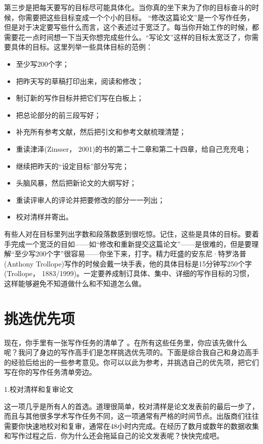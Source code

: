 第三步是把每天要写的目标尽可能具体化。当你真的坐下来为了你的目标奋斗的时候，你需要把这些目标变成一个个小的目标。 “修改这篇论文”是一个写作任务，但是对于决定要写些什么而言，这个表述过于宽泛了。每当你开始工作的时候，都需要花一点时间想一下当天你想完成些什么。“写论文”这样的目标太宽泛了，你需要具体的目标。这里列举一些具体目标的范例：
\begin{itemize}
  \item 至少写200个字；
  \item 把昨天写的草稿打印出来，阅读和修改；
  \item 制订新的写作目标并把它们写在白板上；
  \item 把总论部分的前三段写好；
  \item 补充所有参考文献，然后把引文和参考文献梳理清楚；
  \item 重读津泽(Zinsser， 2001)的书的第二十二章和第二十四章，给自己充充电；
  \item 继续把昨天的“设定目标”部分写完；
  \item 头脑风暴，然后把新论文的大纲写好；
  \item 重读评审人的评论并把要修改的部分一一列出；
  \item 校对清样并寄出。
\end{itemize}

有些人对在目标里列出字数和段落数感到很吃惊。记住，这些是具体的目标。要着手完成一个宽泛的目如——如“修改和重新提交这篇论文”——是很难的，但是要理解“至少写200个字”很容易——你坐下来，打字。精力旺盛的安东尼·特罗洛普(Anthony Trollope)写作的时候会戴一块手表，他的具体目标是15分钟写250个字(Trollope， 1883/1999)。一定要养成制订具体、集中、详细的写作目标的习惯，这样能够避免不知道做什么和不知道怎么做。


\section{挑选优先项}
现在，你手里有一张写作任务的清单了 。在所有这些任务里，你应该先做什么呢？我问了身边的写作高手们是怎样挑选优先项的。下面是综合我自己和身边高手的经验后给出的一些参考意见。你可以以此为参考，并挑选自己的优先项，把它们写在你的写作任务清单旁边。

{\kaishu 1.校对清样和复审论文}

这一项几乎是所有人的首选。道理很简单，校对清样是论文发表前的最后一步了，而且与其他很多学术写作任务不同，这一项通常有严格的时间节点。出版商们往往需要你快速地校对和复审，通常在48小时内完成。在经历了数月或数年的数据收集和写作过程之后．你为什么还会拖延自己的论文发表呢？快快完成吧。

